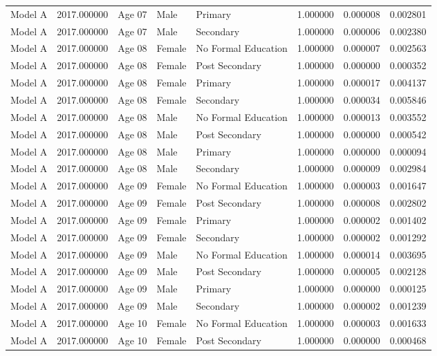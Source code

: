 \begin{table}[ht]
\begin{tabular}{lrlllrrr}
Model A & 2017.000000 & Age 07 & Male & Primary & 1.000000 & 0.000008 & 0.002801 \\
Model A & 2017.000000 & Age 07 & Male & Secondary & 1.000000 & 0.000006 & 0.002380 \\
Model A & 2017.000000 & Age 08 & Female & No Formal Education & 1.000000 & 0.000007 & 0.002563 \\
Model A & 2017.000000 & Age 08 & Female & Post Secondary & 1.000000 & 0.000000 & 0.000352 \\
Model A & 2017.000000 & Age 08 & Female & Primary & 1.000000 & 0.000017 & 0.004137 \\
Model A & 2017.000000 & Age 08 & Female & Secondary & 1.000000 & 0.000034 & 0.005846 \\
Model A & 2017.000000 & Age 08 & Male & No Formal Education & 1.000000 & 0.000013 & 0.003552 \\
Model A & 2017.000000 & Age 08 & Male & Post Secondary & 1.000000 & 0.000000 & 0.000542 \\
Model A & 2017.000000 & Age 08 & Male & Primary & 1.000000 & 0.000000 & 0.000094 \\
Model A & 2017.000000 & Age 08 & Male & Secondary & 1.000000 & 0.000009 & 0.002984 \\
Model A & 2017.000000 & Age 09 & Female & No Formal Education & 1.000000 & 0.000003 & 0.001647 \\
Model A & 2017.000000 & Age 09 & Female & Post Secondary & 1.000000 & 0.000008 & 0.002802 \\
Model A & 2017.000000 & Age 09 & Female & Primary & 1.000000 & 0.000002 & 0.001402 \\
Model A & 2017.000000 & Age 09 & Female & Secondary & 1.000000 & 0.000002 & 0.001292 \\
Model A & 2017.000000 & Age 09 & Male & No Formal Education & 1.000000 & 0.000014 & 0.003695 \\
Model A & 2017.000000 & Age 09 & Male & Post Secondary & 1.000000 & 0.000005 & 0.002128 \\
Model A & 2017.000000 & Age 09 & Male & Primary & 1.000000 & 0.000000 & 0.000125 \\
Model A & 2017.000000 & Age 09 & Male & Secondary & 1.000000 & 0.000002 & 0.001239 \\
Model A & 2017.000000 & Age 10 & Female & No Formal Education & 1.000000 & 0.000003 & 0.001633 \\
Model A & 2017.000000 & Age 10 & Female & Post Secondary & 1.000000 & 0.000000 & 0.000468 \\

\end{tabular}
\end{table}
